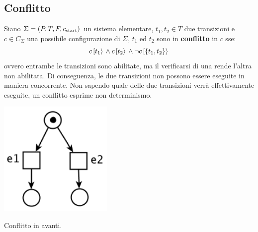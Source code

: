 \subsection*{Conflitto}
\begin{defn}
    Siano $\Sigma = (P, T, F, c_{\textnormal{start}})$ un sistema elementare,
    $t_1, t_2 \in T$ due transizioni e $c \in C_{\Sigma}$ una possibile
    configurazione di $\Sigma$, $t_1$ ed $t_2$ sono in \textbf{conflitto}
    in $c$ sse:
    \[
        c\,[t_1\rangle\, \land c\,[t_2\rangle\, \land
        \lnot c\,[\left\{t_1, t_2\right\}\rangle\,
    \]
    ovvero entrambe le transizioni sono abilitate, ma il verificarsi di una
    rende l'altra non abilitata. Di conseguenza, le due transizioni non
    possono essere eseguite in maniera concorrente. Non sapendo quale
    delle due transizioni verrà effettivamente eseguite, un conflitto esprime
    non determinismo.

    \begin{marginfigure}
        \includegraphics[width=0.75\linewidth]{img/conflitto_avanti.png}
        \caption{Conflitto in avanti.}
        \label{fig:conflitto_avanti}
    \end{marginfigure}


\end{defn}
